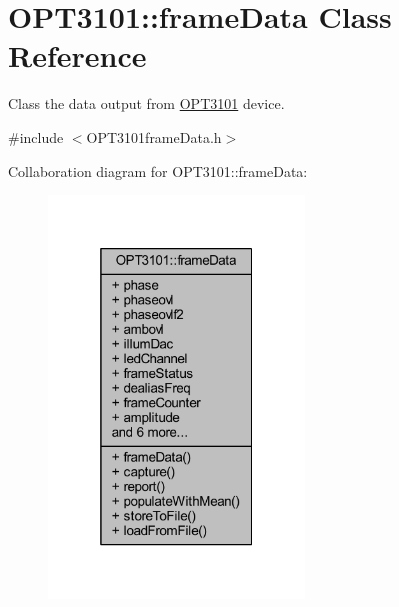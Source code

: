 \hypertarget{class_o_p_t3101_1_1frame_data}{}\section{O\+P\+T3101\+:\+:frame\+Data Class Reference}
\label{class_o_p_t3101_1_1frame_data}


Class the data output from \mbox{\hyperlink{namespace_o_p_t3101}{O\+P\+T3101}} device.  




{\ttfamily \#include $<$O\+P\+T3101frame\+Data.\+h$>$}



Collaboration diagram for O\+P\+T3101\+:\+:frame\+Data\+:\nopagebreak
\begin{figure}[H]
\begin{center}
\leavevmode
\includegraphics[width=193pt]{class_o_p_t3101_1_1frame_data__coll__graph}
\end{center}
\end{figure}
